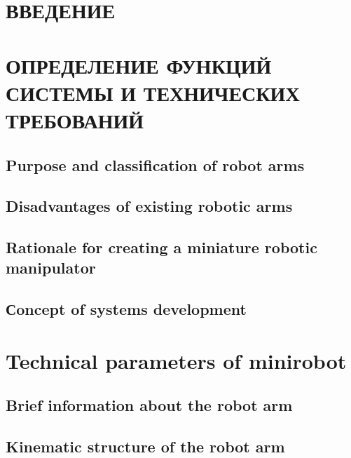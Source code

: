 
\section*{ВВЕДЕНИЕ}


\section{ОПРЕДЕЛЕНИЕ ФУНКЦИЙ СИСТЕМЫ И ТЕХНИЧЕСКИХ ТРЕБОВАНИЙ}


\subsection{Purpose and classification of robot arms} 



\subsection{Disadvantages of existing robotic arms}


\subsection{Rationale for creating a miniature robotic manipulator}


\subsection{Сoncept of systems development}


\section{Technical parameters of minirobot}
\subsection{Brief information about the robot arm} 

\subsection{Kinematic structure of the robot arm}  


